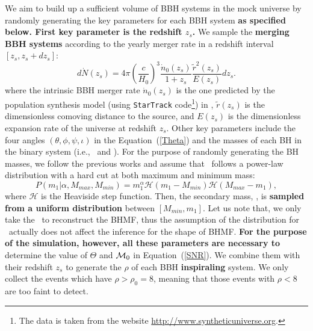\documentclass[twocolumn]{aastex62}
\begin{document}
We aim to build up a sufficient volume of BBH systems in the mock universe by randomly generating the key parameters for each BBH system \textbf{as specified below. First key parameter is the redshift $z_s$.}  We sample the \textbf{merging BBH systems} according to the yearly merger rate in a redshift interval  $[z_{s}, z_{s}+dz_{s}]$:
 \begin{equation}
 d\dot{N} (z_s)=4\pi\left(\frac{c}{H_{0}}\right)^3\frac{\dot{n}_{0}(z_{s})}{1+z_{s}}\frac{\tilde{r}^2(z_{s})}{E(z_{s})}dz_{s}. 
 \end{equation}
where the intrinsic BBH merger rate $\dot{n}_{0}(z_{s})$ is the one predicted by the population synthesis model (using {\tt StarTrack} code\footnote{The data is taken from the website \url{http://www.syntheticuniverse.org}.}) in \citet{Dominik13}, $\tilde{r}(z_{s})$ is the dimensionless comoving distance to the source, and $E (z_s)$ is
the dimensionless expansion rate of the universe at redshift $z_s$. 
Other key parameters include the four angles $(\theta, \phi, \psi, \iota)$ in the Equation~(\ref{Theta})  and the masses of each BH in the binary system (i.e., \mone\ and \mtwo).
For the purpose of randomly generating the BH masses, we follow the previous works \citep{Kovetz2017PhRvD, Abbott2018b, Fishbach2018} and assume that \mone\ follows a power-law distribution with a hard cut at both maximum and minimum mass:
 \begin{equation} \label{equ_powlaw}
P(m_1|\alpha, M_{max}, M_{min}) = m_1^{\alpha} \mathcal{H}(m_1-M_{min}) \mathcal{H}(M_{max}-m_1),
 \end{equation}
where $\mathcal{H}$ is the Heaviside step function. Then, the secondary mass, \mtwo, is %
\textbf{sampled from a uniform distribution} 
between $[M_{min}, m_1]$. Let us note that, we only take the \mone\ to reconstruct the BHMF, thus the assumption of the distribution for \mtwo\ actually does not affect the inference for the shape of BHMF. 
\textbf{For the purpose of the simulation, however, all these parameters are necessary to} determine the value of $\Theta$ and ${\cal M}_0$ in Equation~(\ref{SNR}). We combine them with their redshift $z_s$ to generate the $\rho$ of each BBH \textbf{inspiraling} system. We only collect the events which have $\rho > \rho_0 = 8$, meaning that those events with $\rho < 8$ are too faint to detect. 
\end{document}
